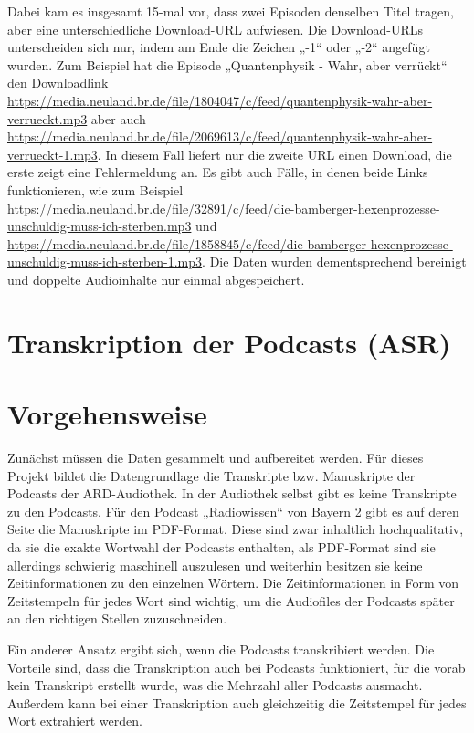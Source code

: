 Dabei kam es insgesamt 15-mal vor, dass zwei Episoden denselben Titel tragen, aber eine unterschiedliche Download-URL aufwiesen.
Die Download-URLs unterscheiden sich nur, indem am Ende die Zeichen „-1“ oder „-2“ angefügt wurden.
Zum Beispiel hat die Episode „Quantenphysik - Wahr, aber verrückt“ den Downloadlink \url{https://media.neuland.br.de/file/1804047/c/feed/quantenphysik-wahr-aber-verrueckt.mp3} aber auch \url{https://media.neuland.br.de/file/2069613/c/feed/quantenphysik-wahr-aber-verrueckt-1.mp3}.
In diesem Fall liefert nur die zweite URL einen Download, die erste zeigt eine Fehlermeldung an.
Es gibt auch Fälle, in denen beide Links funktionieren, wie zum Beispiel \url{https://media.neuland.br.de/file/32891/c/feed/die-bamberger-hexenprozesse-unschuldig-muss-ich-sterben.mp3} und \url{https://media.neuland.br.de/file/1858845/c/feed/die-bamberger-hexenprozesse-unschuldig-muss-ich-sterben-1.mp3}.
Die Daten wurden dementsprechend bereinigt und doppelte Audioinhalte nur einmal abgespeichert.

\section{Transkription der Podcasts (ASR)}

\section{Vorgehensweise}

Zunächst müssen die Daten gesammelt und aufbereitet werden.
Für dieses Projekt bildet die Datengrundlage die Transkripte bzw. Manuskripte der Podcasts der ARD-Audiothek.
In der Audiothek selbst gibt es keine Transkripte zu den Podcasts.
Für den Podcast „Radiowissen“ von Bayern 2 gibt es auf deren Seite die Manuskripte im PDF-Format.
Diese sind zwar inhaltlich hochqualitativ, da sie die exakte Wortwahl der Podcasts enthalten, als PDF-Format sind sie allerdings schwierig maschinell auszulesen und weiterhin besitzen sie keine Zeitinformationen zu den einzelnen Wörtern.
Die Zeitinformationen in Form von Zeitstempeln für jedes Wort sind wichtig, um die Audiofiles der Podcasts später an den richtigen Stellen zuzuschneiden.

Ein anderer Ansatz ergibt sich, wenn die Podcasts transkribiert werden.
Die Vorteile sind, dass die Transkription auch bei Podcasts funktioniert, für die vorab kein Transkript erstellt wurde, was die Mehrzahl aller Podcasts ausmacht.
Außerdem kann bei einer Transkription auch gleichzeitig die Zeitstempel für jedes Wort extrahiert werden.

